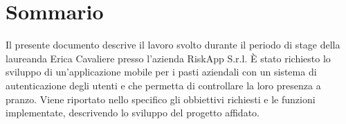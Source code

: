 \cleardoublepage
{}
{}
\begingroup
\let\clearpage\relax
\let\cleardoublepage\relax
\let\cleardoublepage\relax

\chapter*{Sommario}

Il presente documento descrive il lavoro svolto durante il periodo di stage della laureanda Erica Cavaliere presso l'azienda RiskApp S.r.l.\newline
È stato richiesto lo sviluppo di un'applicazione mobile per i pasti aziendali con un sistema di autenticazione degli utenti e che permetta di controllare la loro presenza a pranzo.\newline
Viene riportato nello specifico gli obbiettivi richiesti e le funzioni implementate, descrivendo lo sviluppo del progetto affidato.




\endgroup

\vfill
